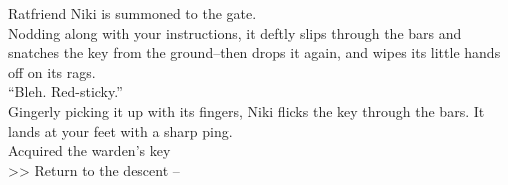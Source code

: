 Ratfriend Niki is summoned to the gate.\\

Nodding along with your instructions, it deftly slips through the bars and snatches the key from the ground--then drops it again, and wipes its little hands off on its rags.\\
“Bleh. Red-sticky.”\\

Gingerly picking it up with its fingers, Niki flicks the key through the bars. It lands at your feet with a sharp ping.\\
 Acquired the warden's key\\

>> Return to the descent -- 